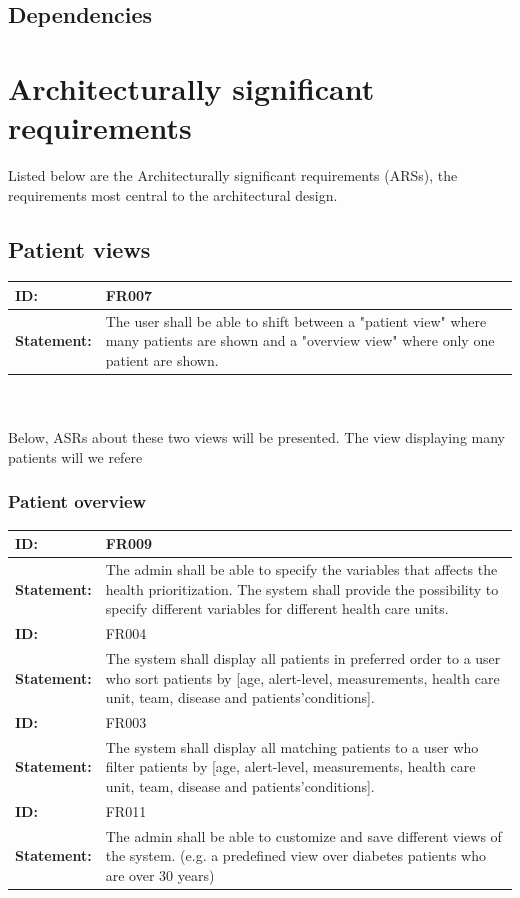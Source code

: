 \documentclass{article}
\begin{document}
\subsection{Dependencies}


\section{Architecturally significant requirements}
Listed below are the Architecturally significant requirements (ARSs), the requirements most central to the architectural design. 

\subsection{Patient views}
\begin{tabularx}{\linewidth}{| l | X |}
 \hline
 \textbf{ID:} & FR007  \\ 
 \hline
 \textbf{Statement:} & The user shall be able to shift between a "patient view" where many patients are shown and a "overview view" where only one patient are shown. \\
 \hline
\end{tabularx}
\\ \\

Below, ASRs about these two views will be presented. The view displaying many patients will we refere

\subsubsection{Patient overview}
\begin{tabularx}{\linewidth}{| l | X |}
 \hline
 \textbf{ID:} & FR009  \\ 
 \hline
 \textbf{Statement:} & The admin shall be able to specify the variables that affects the health prioritization. The system shall provide the possibility to specify different variables for different health care units. 
 \\ 
 \hline
 
 \textbf{ID:} & FR004  \\ 
 \hline
 \textbf{Statement:} & The system shall display all patients in preferred order to a user who sort patients by [age, alert-level, measurements, health care unit, team, disease and patients’conditions]. \\ 
 \hline
 
 \textbf{ID:} & FR003  \\ 
 \hline
 \textbf{Statement:} & The system shall display all matching patients to a user who filter patients by [age, alert-level, measurements, health care unit, team, disease and patients’conditions]. \\ 
 \hline

 \textbf{ID:} & FR011  \\ 
 \hline
 \textbf{Statement:} & The admin shall be able to customize and save different views of the system. (e.g. a predefined view over diabetes patients who are over 30 years)
  \\ 
 \hline
\end{tabularx}
\\ \\
\end{document}
